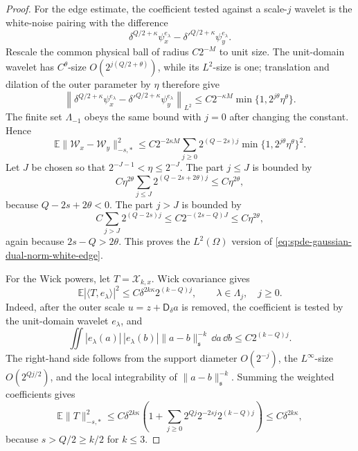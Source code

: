 \begin{proof}
For the edge estimate, the coefficient tested against a scale-\(j\) wavelet
is the white-noise pairing with the difference
\[
  \delta^{Q/2+\kappa}\psi_x^{e_\lambda}
  -
  {\delta'}^{Q/2+\kappa}\psi_y^{e_\lambda}.
\]
Rescale the common physical ball of radius \(C2^{-M}\) to unit size.  The
unit-domain wavelet has \(C^\theta\)-size \(O(2^{j(Q/2+\theta)})\), while
its \(L^2\)-size is one; translation and dilation of the outer parameter by
\(\eta\) therefore give
\begin{equation}
  \left\|
    \delta^{Q/2+\kappa}\psi_x^{e_\lambda}
    -
    {\delta'}^{Q/2+\kappa}\psi_y^{e_\lambda}
  \right\|_{L^2}
  \leq
  C2^{-\kappa M}\min\{1,2^{j\theta}\eta^\theta\}.
  \label{eq:spde-white-dual-coefficient-edge}
\end{equation}
The finite set \(\Lambda_{-1}\) obeys the same bound with \(j=0\) after
changing the constant.  Hence
\[
  \mathbb E\|\mathcal W_x-\mathcal W_y\|_{-s,*}^2
  \leq
  C2^{-2\kappa M}
  \sum_{j\geq0}
    2^{(Q-2s)j}\min\{1,2^{j\theta}\eta^\theta\}^2 .
\]
Let \(J\) be chosen so that \(2^{-J-1}<\eta\leq2^{-J}\).  The part
\(j\leq J\) is bounded by
\[
  C\eta^{2\theta}
  \sum_{j\leq J}2^{(Q-2s+2\theta)j}
  \leq
  C\eta^{2\theta},
\]
because \(Q-2s+2\theta<0\).  The part \(j>J\) is bounded by
\[
  C\sum_{j>J}2^{(Q-2s)j}
  \leq
  C2^{-(2s-Q)J}
  \leq
  C\eta^{2\theta},
\]
again because \(2s-Q>2\theta\).  This proves the \(L^2(\Omega)\) version of
\eqref{eq:spde-gaussian-dual-norm-white-edge}.

For the Wick powers, let \(T=\mathcal X_{k,x}\).  Wick covariance gives
\begin{equation}
  \mathbb E|\langle T,e_\lambda\rangle|^2
  \leq
  C\delta^{2k\kappa}2^{(k-Q)j},
  \qquad \lambda\in\Lambda_j,\quad j\geq0.
  \label{eq:spde-wick-dual-coefficient-scale}
\end{equation}
Indeed, after the outer scale \(u=z+\mathsf D_\delta a\) is removed, the
coefficient is tested by the unit-domain wavelet \(e_\lambda\), and
\[
  \iint
  |e_\lambda(a)|\,|e_\lambda(b)|
  \|a-b\|_{\mathfrak s}^{-k}\,\dd a\,\dd b
  \leq
  C2^{(k-Q)j}.
\]
The right-hand side follows from the support diameter \(O(2^{-j})\), the
\(L^\infty\)-size \(O(2^{Qj/2})\), and the local integrability of
\(\|a-b\|_{\mathfrak s}^{-k}\).  Summing the weighted coefficients gives
\begin{equation}
  \mathbb E\|T\|_{-s,*}^2
  \leq
  C\delta^{2k\kappa}
  \left(
    1+\sum_{j\geq0}2^{Qj}2^{-2sj}2^{(k-Q)j}
  \right)
  \leq
  C\delta^{2k\kappa},
  \label{eq:spde-wick-dual-ltwo}
\end{equation}
because \(s>Q/2\geq k/2\) for \(k\leq3\).


\end{proof}
